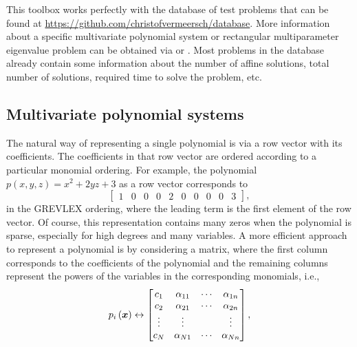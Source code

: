 \documentclass{manual}
\begin{document}
        This toolbox works perfectly with the database of test problems that can be found at \url{https://github.com/christofvermeersch/database}.
        More information about a specific multivariate polynomial system or rectangular multiparameter eigenvalue problem can be obtained via  or .
        Most problems in the database already contain some information about the number of affine solutions, total number of solutions, required time to solve the problem, etc.

        \subsection{Multivariate polynomial systems}

            The natural way of representing a single polynomial is via a row vector with its coefficients.
            The coefficients in that row vector are ordered according to a particular monomial ordering.
            For example, the polynomial $p(x,y,z) = x^2 + 2 y z + 3$ as a row vector corresponds to
            \begin{equation}
                \begin{bmatrix}
                    1 & 0 & 0 & 0 & 2 & 0 & 0 & 0 & 0 & 3
                \end{bmatrix},
            \end{equation}
            in the GREVLEX ordering, where the leading term is the first element of the row vector.
            Of course, this representation contains many zeros when the polynomial is sparse, especially for high degrees and many variables.
            A more efficient approach to represent a polynomial is by considering a matrix, where the first column corresponds to the coefficients of the polynomial and the remaining columns represent the powers of the variables in the corresponding monomials, i.e.,
            \begin{equation}
                p_i \left( \bm{x} \right) \leftrightarrow
                \begin{bmatrix}
                    c_1 & \alpha_{11} & \cdots & \alpha_{1n} \\
                    c_2 & \alpha_{21} & \cdots & \alpha_{2n} \\
                    \vdots & \vdots & & \vdots \\
                    c_N & \alpha_{N1} & \cdots & \alpha_{Nn} \\
                \end{bmatrix},
            \end{equation}
\end{document}
